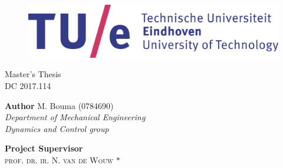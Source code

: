 \documentclass[DC2017114Bouma.tex]{subfiles}
\begin{document}
\begin{figure}[H]
\centering
\begin{minipage}{.495\textwidth}
  \includegraphics[width=0.9\linewidth]{tuelogo.eps}
\end{minipage}
\end{figure}  

\begin{center}

\vspace*{80pt}
\huge{\textbf{\mytitle}}

\vspace*{30pt}
{\LARGE Master's Thesis} \\
{\Large DC 2017.114}

\end{center}

\vspace{\fill}
\begin{minipage}[t]{0.4\textwidth}
	\begin{flushleft} 
		\textbf{Author}
		\vskip3pt
		M. Bouma (0784690)\\
		\textit{Department of Mechanical Engineering\\
			Dynamics and Control group}
	\end{flushleft}
\end{minipage}
\hfill
\begin{minipage}[t]{0.4\textwidth}
	\begin{flushright} 
		\textbf{Project Supervisor}\\
		\textsc{prof. dr. ir. N. van de Wouw} $*$\\
	\end{flushright}
\end{minipage}
\bigskip
\end{document}
